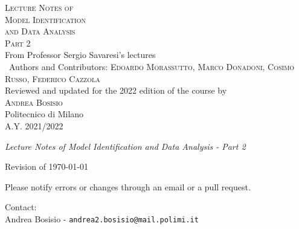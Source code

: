 \documentclass[10pt,a4paper,oneside,openright]{book}
\begin{document}

\frontmatter
\pagestyle{empty}
\vspace*{\fill}
\begin{center}
	{\large \textsc{Lecture Notes of}}\\
	\vspace*{0.4cm}
	{\Huge \textsc{Model Identification}}\\
	\vspace*{0.4cm}
	{\Huge \textsc{and Data Analysis}}\\
	\vspace{0.6cm}
	{\Huge \textsc{Part 2}}\\
	\vspace*{1cm}
	{\large {From Professor Sergio Savaresi's lectures}}\\
	\vspace*{0.4cm}
	{\large {Authors and Contributors: \textsc{Edoardo Morassutto}, \textsc{Marco Donadoni}, \textsc{Cosimo Russo}, \textsc{Federico Cazzola}}}\\
  \vspace{20pt}
	{{Reviewed and updated for the 2022 edition of the course by \\ \textsc{Andrea Bosisio}}}\\
	\vspace*{3cm}
	Politecnico di Milano\\A.Y. 2021/2022
\end{center}
\vspace*{\fill}
\newpage


{\Large \textit{Lecture Notes of Model Identification and Data Analysis - Part 2}}

\vspace*{\fill}



\vspace*{1cm}

Revision of \today


Please notify errors or changes through an email or a pull request.

Contact:\\
Andrea Bosisio - \texttt{andrea2.bosisio@mail.polimi.it}\\ 

\newpage
\end{document}
